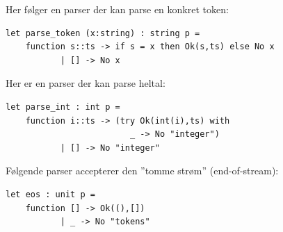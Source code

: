 \documentclass[rgb]{beamer}
\begin{document}
\begin{frame}[fragile]
\begin{footnotesize}


  Her følger en parser der kan parse en konkret token:

\vspace{1ex}

\begin{lstlisting}[numbers=none,frame=none,mathescape]
  let parse_token (x:string) : string p =
    function s::ts -> if s = x then Ok(s,ts) else No x
           | [] -> No x
\end{lstlisting}

\vspace{1ex}

Her er en parser der kan parse heltal:

\vspace{1ex}

\begin{lstlisting}[numbers=none,frame=none,mathescape]
  let parse_int : int p =
    function i::ts -> (try Ok(int(i),ts) with
                         _ -> No "integer")
           | [] -> No "integer"
\end{lstlisting}

\vspace{1ex}

Følgende parser accepterer den ''tomme strøm'' (end-of-stream):

\vspace{1ex}

\begin{lstlisting}[numbers=none,frame=none,mathescape]
  let eos : unit p =
    function [] -> Ok((),[])
           | _ -> No "tokens"
\end{lstlisting}

\end{footnotesize}
\end{frame}

\end{document}
